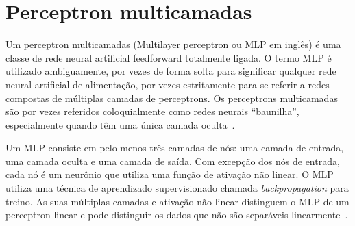 \section{Perceptron multicamadas}
\label{sec:fun:mlp}

Um perceptron multicamadas (Multilayer perceptron ou MLP em inglês) é uma classe de rede neural artificial feedforward totalmente ligada.
O termo MLP é utilizado ambiguamente, por vezes de forma solta para significar qualquer rede neural artificial de alimentação, por vezes estritamente para se referir a redes compostas de múltiplas camadas de perceptrons.
Os perceptrons multicamadas são por vezes referidos coloquialmente como redes neurais ``baunilha'', especialmente quando têm uma única camada oculta~\cite{elementsofstatisticallearning}.

Um MLP consiste em pelo menos três camadas de nós: uma camada de entrada, uma camada oculta e uma camada de saída.
Com excepção dos nós de entrada, cada nó é um neurônio que utiliza uma função de ativação não linear.
O MLP utiliza uma técnica de aprendizado supervisionado chamada \textit{backpropagation} para treino.
As suas múltiplas camadas e ativação não linear distinguem o MLP de um perceptron linear e pode distinguir os dados que não são separáveis linearmente~\cite{perceptrons}.
